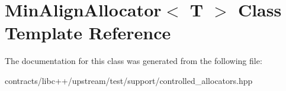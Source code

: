 \hypertarget{class_min_align_allocator}{}\section{Min\+Align\+Allocator$<$ T $>$ Class Template Reference}
\label{class_min_align_allocator}


The documentation for this class was generated from the following file\+:\begin{DoxyCompactItemize}
\item 
contracts/libc++/upstream/test/support/controlled\+\_\+allocators.\+hpp\end{DoxyCompactItemize}
